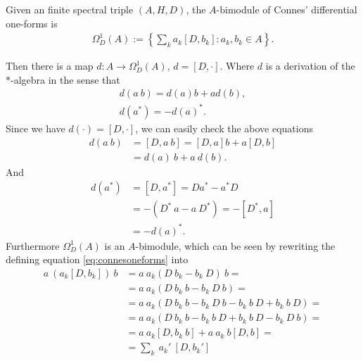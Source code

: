 \begin{definition}
    Given an finite spectral triple $(A, H, D)$, the $A$-bimodule of
    Connes' differential one-forms is
    \begin{align}\label{eq:connesoneforms}
        \Omega _D ^1 (A) := \left\{ \sum _k a_k[D, b_k]: a_k, b_k \in A
        \right\}.
    \end{align}
\end{definition}
Then there is a map $d:A\rightarrow \Omega _D ^1 (A)$, $d = [D, \cdot]$. Where
$d$ is a derivation of the $*$-algebra in the sense that
\begin{align}
    d(a\ b) = d(a)b + ad(b), \\
    d(a^*) = -d(a)^*.
\end{align}
Since we have $d(\cdot) = [D, \cdot]$, we can easily check the above equations
\begin{align}
    d(a\ b) &= [D, a\ b] = [D, a]b + a[D,b]\nonumber\\
    &= d(a)\ b + a\ d(b).
\end{align}
And
\begin{align}
    d(a^*) &= [D, a^*] = Da^* - a^*D \nonumber\\
    &=-(D^*\ a - a\ D^*) = -[D^*, a] \nonumber\\
    &= -d(a)^*.
\end{align}
Furthermore $\Omega _D^1 (A)$ is an $A$-bimodule, which can be seen by
rewriting the defining equation \eqref{eq:connesoneforms} into
\begin{align}
    a\ (a_k[D, b_k])\ b &= a\ a_k(D\ b_k - b_k\ D)\ b = \nonumber\\
       &= a\ a_k(D\ b_k\ b - b_k\ D\ b)=\nonumber\\
       &= a\ a_k(D\ b_k\ b - b_k\ D\ b - b_k\
       b\ D +b_k\ b\ D)=
       \nonumber\\
       &= a\ a_k(D\ b_k\ b-b_k\ b\ D + b_k\ b\ D - b_k\ D\ b) = \nonumber \\
       &= a\ a_k [D, b_k\ b] + a\ a_k\ b [D, b]=\nonumber\\
       &= \sum _k\ a_k'\ [D, b_k']
\end{align}

